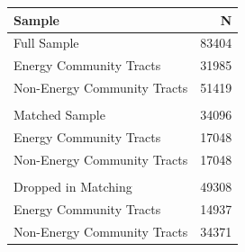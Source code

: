 \begin{tabular}{lr}
  \toprule
Sample & N \\ 
  \midrule
Full Sample & 83404 \\ 
  \quad Energy Community Tracts & 31985 \\ 
  \quad Non-Energy Community Tracts & 51419 \\ 
   &  \\ 
  Matched Sample & 34096 \\ 
  \quad Energy Community Tracts & 17048 \\ 
  \quad Non-Energy Community Tracts & 17048 \\ 
   &  \\ 
  Dropped in Matching & 49308 \\ 
  \quad Energy Community Tracts & 14937 \\ 
  \quad Non-Energy Community Tracts & 34371 \\ 
   \bottomrule
\end{tabular}
